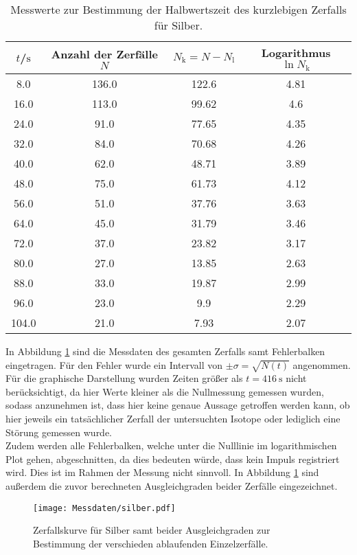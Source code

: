 \begin{table}
	\centering
	\caption{Messwerte zur Bestimmung der Halbwertszeit des kurzlebigen Zerfalls für Silber.}
	\label{tab:silver1}
\begin{tabular}{cccc}
	\toprule
$t$/$\si{\second}$ & Anzahl der Zerfälle $N$&$N_\mathrm{k}=N-N_\mathrm{l}$ & Logarithmus $\ln{N_\mathrm{k}}$ \\
\midrule
8.0 & 136.0 & 122.6 & 4.81 \\
16.0 & 113.0 & 99.62 & 4.6 \\
24.0 & 91.0 & 77.65 & 4.35 \\
32.0 & 84.0 & 70.68 & 4.26 \\
40.0 & 62.0 & 48.71 & 3.89 \\
48.0 & 75.0 & 61.73 & 4.12 \\
56.0 & 51.0 & 37.76 & 3.63 \\
64.0 & 45.0 & 31.79 & 3.46 \\
72.0 & 37.0 & 23.82 & 3.17 \\
80.0 & 27.0 & 13.85 & 2.63 \\
88.0 & 33.0 & 19.87 & 2.99 \\
96.0 & 23.0 & 9.9 & 2.29 \\
104.0 & 21.0 & 7.93 & 2.07 \\
\bottomrule
\end{tabular}
\end{table}

In Abbildung \ref{fig:silber} sind die Messdaten des gesamten Zerfalls samt Fehlerbalken eingetragen.
Für den Fehler wurde ein Intervall von $\pm \sigma=\sqrt{N(t)}$ angenommen.
Für die graphische Darstellung wurden Zeiten größer als $t=\SI{416}{\second}$ nicht berücksichtigt, da hier Werte kleiner als die Nullmessung gemessen wurden, sodass anzunehmen ist, dass hier keine genaue Aussage getroffen werden kann, ob hier jeweils ein tatsächlicher Zerfall der untersuchten Isotope oder lediglich eine Störung gemessen wurde.\\
Zudem werden alle Fehlerbalken, welche unter die Nulllinie im logarithmischen Plot gehen, abgeschnitten, da dies bedeuten würde, dass kein Impuls registriert wird. Dies ist im Rahmen der Messung nicht sinnvoll.
In Abbildung \ref{fig:silber} sind außerdem die zuvor berechneten Ausgleichgraden beider Zerfälle eingezeichnet.

\begin{figure}
  \centering
  \texttt{[image: Messdaten/silber.pdf]}
  \caption{Zerfallskurve für Silber samt beider Ausgleichgraden zur Bestimmung der verschieden ablaufenden Einzelzerfälle.}
  \label{fig:silber}
\end{figure}


